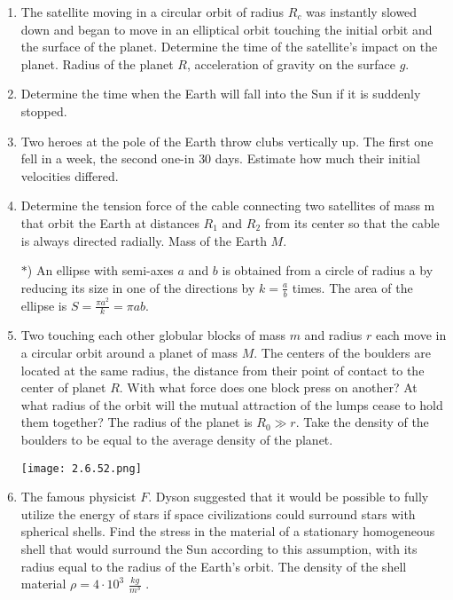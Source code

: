 \documentclass{article}
\begin{document}
\begin{enumerate}[label=2.6.\arabic*]
\item The satellite moving in a circular orbit of radius $R_c$ was instantly slowed down and began to move in an elliptical orbit touching the initial orbit and the surface of the planet. Determine the time of the satellite's impact on the planet. Radius of the planet $R$, acceleration of gravity on the surface $g$.

\item Determine the time when the Earth will fall into the Sun if it is suddenly stopped.

\item Two heroes at the pole of the Earth throw clubs vertically up. The first one fell in a week, the second one-in $30$ days. Estimate how much their initial velocities differed.

\item Determine the tension force of the cable connecting two satellites of mass m that orbit the Earth at distances $R_1$ and $R_2$ from its center so that the cable is always directed radially. Mass of the Earth $M$.

$\ast$) An ellipse with semi-axes $a$ and $b$ is obtained from a circle of radius a by reducing its size in one of the directions by $k = \frac{a}{b}$ times. The area of the ellipse is $S = \frac{\pi a^2}{k} = \pi ab$.

\item Two touching each other globular blocks of mass $m$ and radius $r$ each move in a circular orbit around a planet of mass $M$. The centers of the boulders are located at the same radius, the distance from their point of contact to the center of planet $R$. With what force does one block press on another? At what radius of the orbit will the mutual attraction of the lumps cease to hold them together? The radius of the planet is $R_0 \gg r$. Take the density of the boulders to be equal to the average density of the planet.

\begin{center}
    \texttt{[image: 2.6.52.png]}
\end{center}

\item The famous physicist $F$. Dyson suggested that it would be possible to fully utilize the energy of stars if space civilizations could surround stars with spherical shells. Find the stress in the material of a stationary homogeneous shell that would surround the Sun according to this assumption, with its radius equal to the radius of the Earth's orbit. The density of the shell material $\rho = 4 \cdot 10^3$ $\frac{kg}{m^3}$ .




\end{enumerate}
\end{document}
